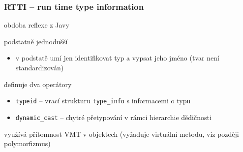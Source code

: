 




\begin{frame}[fragile]
\frametitle{RTTI -- run time type information}

\begin{bitemize}
\item obdoba reflexe z Javy
\item podstatně jednodušší 
\begin{itemize}
\item v podstatě umí jen identifikovat typ a vypsat jeho jméno (tvar není standardizován)
\end{itemize}
\item definuje dva operátory
\begin{itemize}
\item \lstinline|typeid| -- vrací strukturu \lstinline|type_info| s informacemi o typu
\item \lstinline|dynamic_cast| -- chytré přetypování v rámci hierarchie dědičnosti
\end{itemize}
\item využívá přítomnost VMT v objektech (vyžaduje virtuální metodu, viz později polymorfizmus)
\end{bitemize}
\end{frame}







